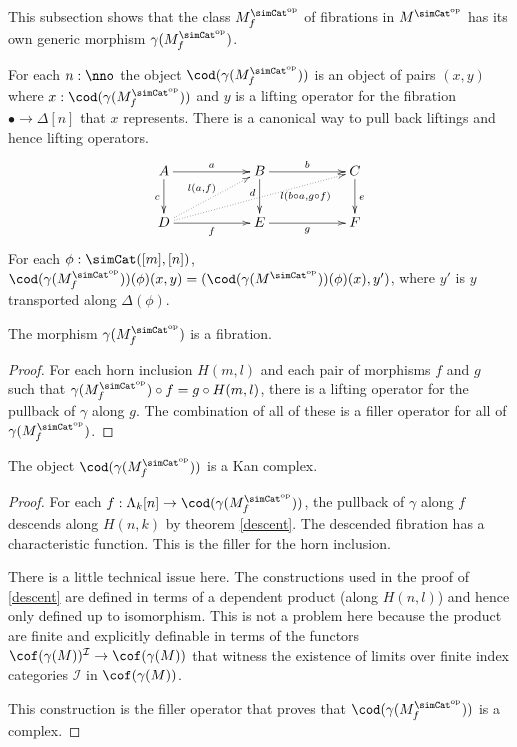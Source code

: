 \documentclass{tac}
\newcommand\cat\mathcal
\newcommand\dual{^{\mathrm{op}}}
\newcommand\s{^{\simCat\dual}}
\newcommand\of{:}
\newcommand\simplex\Delta
\newcommand\horn\Lambda
\newcommand\f{_f}
\newcommand\gen\gamma
\begin{document}
This subsection shows that the class $M\s\f$ of fibrations in $M\s$ has its own generic morphism $\gen(M\s\f)$.

\begin{definition}
For each $n\of\nno$ the object $\cod(\gen(M\s\f))$ is an object of pairs $(x,y)$ where $x\of \cod(\gen(M\s\f))$ and $y$ is a lifting operator for the fibration $\bullet\to\simplex[n]$ that $x$ represents. There is a canonical way to pull back liftings and hence lifting operators.
\[\xymatrix{
A\ar[rr]^a\ar[d]_c && B \ar[rr]^b\ar[d]_(.4)d && C\ar[d]^e\\
D\ar[rr]_f \ar@{.>}[urrrr]_(.7){l(b\circ a, g\circ f)}\ar@{.>}[urr]^{l(a, f)} && E \ar[rr]_g && F
}\]
For each $\phi\of \simCat([m],[n])$, $\cod(\gen(M\s\f))(\phi)(x,y) = (\cod(\gen(M\s))(\phi)(x),y')$, where $y'$ is $y$ transported along $\simplex(\phi)$.
\end{definition}


\begin{lemma} The morphism $\gen(M\s\f)$ is a fibration. \end{lemma}

\begin{proof} For each horn inclusion $H(m,l)$ and each pair of morphisms $f$ and $g$ such that $\gen(M\s\f)\circ f=g\circ H(m,l)$, there is a lifting operator for the pullback of $\gen$ along $g$. The combination of all of these is a filler operator for all of $\gen(M\s\f)$.
\end{proof}


\begin{lemma} The object $\cod(\gen(M\s\f))$ is a Kan complex. \end{lemma}

\begin{proof} For each $f\of\horn_k[n]\to \cod(\gen(M\s\f))$, the pullback of $\gen$ along $f$ descends along $H(n,k)$ by theorem \ref{descent}. The descended fibration has a characteristic function. This is the filler for the horn inclusion. %

There is a little technical issue here. The constructions used in the proof of \ref{descent} are defined in terms of a dependent product (along $H(n,l)$) and hence only defined up to isomorphism. This is not a problem here because the product are finite and explicitly definable in terms of the functors $\cof(\gen(M))^\cat I \to \cof(\gen(M))$ that witness the existence of limits over finite index categories $\cat I$ in $\cof(\gen(M))$.

This construction is the filler operator that proves that $\cod(\gen(M\s\f))$ is a complex.
\end{proof}
\end{document}
